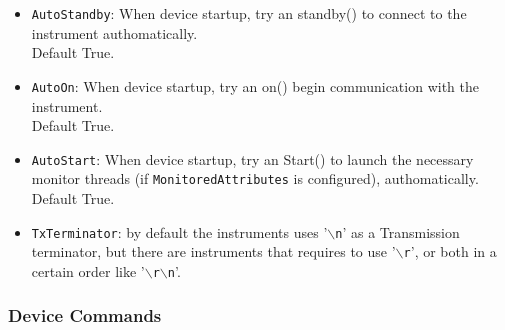 \documentclass[a4paper,10pt]{article}
\begin{document}
\begin{itemize}
    \item {\tt AutoStandby}: When device startup, try an standby() to connect to the instrument authomatically.\\ Default True.
    \item {\tt AutoOn}: When device startup, try an on() begin communication with the instrument.\\ Default True.
    \item {\tt AutoStart}: When device startup, try an Start() to launch the necessary monitor threads (if {\tt MonitoredAttributes} is configured), authomatically.\\ Default True.
    \item {\tt TxTerminator}: by default the instruments uses '$\backslash${\tt n}' as a Transmission terminator, but there are instruments that requires to use '$\backslash${\tt r}', or both in a certain order like '$\backslash${\tt r}$\backslash${\tt n}'.
\end{itemize}

\subsubsection{Device Commands}\label{sec:devCmds}
\end{document}
